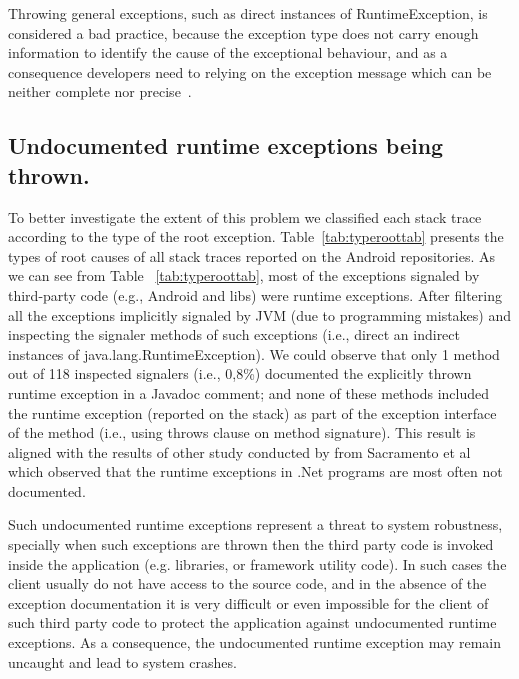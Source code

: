\documentclass[conference]{IEEEtran}
\begin{document}
Throwing general exceptions, such as direct instances of RuntimeException, is  considered a
bad practice, because the exception type does not carry enough information to identify the
cause of the exceptional behaviour, and as a consequence developers need to relying on
the exception message which can be neither complete nor precise~\cite{gosling2000java}.


\subsection{Undocumented runtime exceptions being thrown.}

To better investigate the extent of this problem we classified each stack trace according to the type of the
root exception. Table~\ref{tab:typeroottab} presents the types of root causes of all stack traces reported on 
the Android repositories. As we can see from Table ~\ref{tab:typeroottab},  most of the exceptions signaled by third-party code
 (e.g., Android and libs) were runtime exceptions. After filtering all the exceptions implicitly signaled by 
JVM (due to programming mistakes) and inspecting the signaler methods of such exceptions (i.e.,  direct an indirect 
instances of java.lang.RuntimeException). We could observe that only 1 method out of 118 inspected signalers
 (i.e., 0,8\%) documented the explicitly thrown runtime exception in a Javadoc comment; and none of these methods
included the runtime exception  (reported on the stack) as part of the exception interface of the method (i.e., using 
throws clause on method signature). This result is aligned with the results of other  study conducted by from 
Sacramento et al ~\cite{sacramento2006unchecked} which observed that the
runtime exceptions in .Net programs are most often not documented.

Such undocumented runtime exceptions represent a threat to system robustness, specially
when such exceptions are thrown then the third party code is invoked inside the application (e.g. libraries, or framework utility code).
In such cases the client usually do not have access to the source code, and in the absence of
the exception documentation it is very difficult or even impossible for the client of such third party code to 
protect the application against undocumented runtime exceptions. As a consequence, the
 undocumented runtime exception may remain uncaught and lead to system crashes.
\end{document}
